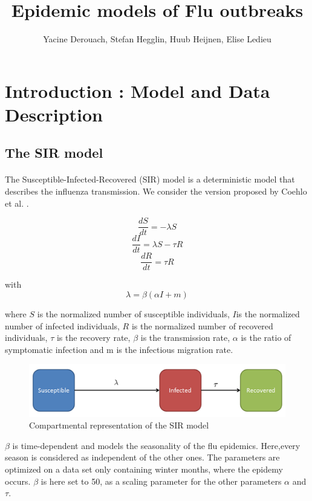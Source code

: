 \documentclass[11pt, a4paper]{article}
\author{Yacine Derouach, Stefan Hegglin, Huub Heijnen, Elise Ledieu}
\title{Epidemic models of Flu outbreaks}
\begin{document}
\maketitle

\section{Introduction : Model and Data Description}
\label{sec:intro}
\subsection{The SIR model}
\label{sec:SIR}
\paragraph{}
The Susceptible-Infected-Recovered (SIR) model is a deterministic model that describes the influenza transmission. We consider the version proposed by Coehlo et al. \cite{coelho2011bayesian}.

\begin{equation}
\frac{dS}{dt} = - \lambda S
\end{equation}
\begin{equation}
\frac{dI}{dt} = \lambda S - \tau R
\end{equation}
\begin{equation}
\frac{dR}{dt} = \tau R
\end{equation}

with \[ \lambda = \beta (\alpha I + m) \]

where $S$ is the normalized number of susceptible individuals, $I$is the normalized number of infected individuals, $R$ is the normalized number of recovered individuals, $\tau $ is the recovery rate, $\beta $ is the transmission rate, $\alpha$ is the ratio of symptomatic infection and m is the infectious migration rate.

\begin{figure}[h]
\FloatBarrier
\center
   \includegraphics[width = \textwidth]{figures/picture1.png}
   \caption{Compartmental representation of the SIR model}
   \label{SIRcr}
\end{figure}

$\beta$ is time-dependent and models the seasonality of the flu epidemics. Here,every season is considered as independent of the other ones. The parameters are optimized on a data set only containing winter months, where the epidemy occurs. $\beta$ is here set to 50, as a scaling parameter for the other parameters $\alpha$ and $\tau$.
\end{document}
